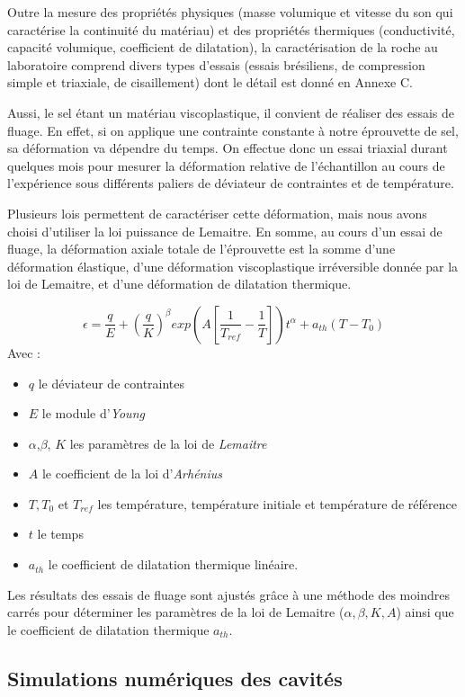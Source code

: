 \documentclass[11pt,french,a4paper]{article}
\begin{document}
Outre la mesure des propriétés physiques (masse volumique et vitesse du son qui caractérise la continuité du matériau) et des propriétés thermiques (conductivité, capacité volumique, coefficient de dilatation), la caractérisation de la roche au laboratoire comprend divers types d’essais (essais brésiliens, de compression simple et triaxiale, de cisaillement) dont le détail est donné en Annexe C.
 
Aussi, le sel étant un matériau viscoplastique, il convient de réaliser des essais de fluage. En effet, si on applique une contrainte constante à notre éprouvette de sel, sa déformation va dépendre du temps.  
On effectue donc un essai triaxial durant quelques mois pour mesurer la déformation relative de l’échantillon au cours de l’expérience sous différents paliers de déviateur de contraintes et de température.

\vspace{.5cm}
Plusieurs lois permettent de caractériser cette déformation, mais nous avons choisi d’utiliser la loi puissance de Lemaitre. En somme, au cours d'un essai de fluage, la déformation axiale totale de l'éprouvette est la somme d’une déformation élastique, d'une déformation viscoplastique irréversible donnée par la loi de Lemaitre, et d'une déformation de dilatation thermique.

$$ \epsilon = \frac{q}{E} + (\frac{q}{K})^{\beta} exp(A[\frac{1}{T_{ref}} - \frac{1}{T}])t^{\alpha} + a_{th} (T-T_0) $$
Avec : \begin{itemize}
\item $q$ le déviateur de contraintes
\item $E$ le module d'\emph{Young}
\item $\alpha$,$\beta$, $K$ les paramètres de la loi de \emph{Lemaitre}
\item $ A $ le coefficient de la loi d'\emph{Arhénius}
\item $T, T_0$ et $T_{ref}$ les température, température initiale et température de référence
\item $t$ le temps
\item $a_{th} $ le coefficient de dilatation thermique linéaire.
\end{itemize}
Les résultats des essais de fluage sont ajustés grâce à une méthode des moindres carrés pour déterminer les paramètres de la loi de Lemaitre ($\alpha,\beta, K, A$) ainsi que le coefficient de dilatation thermique $a_{th}$. 


\subsection{Simulations numériques des cavités}
\end{document}
